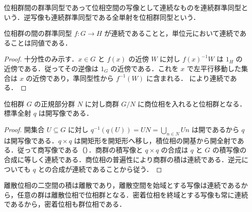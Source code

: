 \begin{defn}[連続群準同型]
位相群間の群準同型であって位相空間の写像として連続なものを連続群準同型という．逆写像も連続群準同型である全単射を位相群同型という．
\end{defn}
\begin{prop}[準同型の単位元における連続性]
位相群の間の群準同型 $f:G\to H$ が連続であることと，単位元において連続であることは同値である．
\end{prop}
\begin{proof}
十分性のみ示す．$x\in G$ と $f(x)$ の近傍 $W$ に対し $f(x)^{-1}W$ は $1_H$ の近傍である．従ってその逆像は $1_G$ の近傍である．これを $x$ で左平行移動した集合は $x$ の近傍であり，準同型性から $f^{-1}(W)$ に含まれる． により連続である．
\end{proof}
\begin{prop}[商位相群]
位相群 $G$ の正規部分群 $N$ に対し商群 $G/N$ に商位相を入れると位相群となる．標準全射 $q$ は開写像である．
\end{prop}
\begin{proof}
開集合 $U\subseteq G$ に対し $q^{-1}(q(U))=UN=\bigcup_{n\in N}Un$ は開であるから $q$ は開写像である．$q\times q$ は開矩形を開矩形へ移し，積位相の開基から開全射である．従って商写像である（）．商群の積写像と $q\times q$ の合成は $q$ と $G$ の積写像の合成に等しく連続である．商位相の普遍性により商群の積は連続である．逆元についても $q$ との合成が連続であることから従う．
\end{proof}
\begin{prop}[離散群と密着群]
離散位相の二空間の積は離散であり，離散空間を始域とする写像は連続であるから，任意の群は離散位相で位相群となる．密着位相を終域とする写像も常に連続であるから，密着位相も群位相である．
\end{prop}
